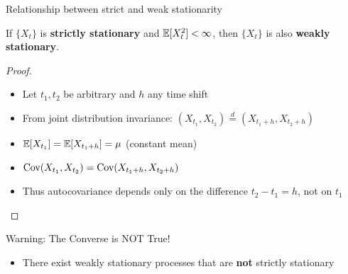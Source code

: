 \documentclass[9pt, aspectratio=169, t]{beamer}
\begin{document}
\begin{frame}{Relationship between strict and weak stationarity}
    \begin{thm}
        If $\{X_t\}$ is \textbf{strictly stationary} and $\mathbb{E}[X_t^2] < \infty$, then $\{X_t\}$ is also \textbf{weakly stationary}.
    \end{thm}

    \begin{proof}[Proof]
        \begin{itemize}\setlength{\itemsep}{0pt}
            \item Let $t_1, t_2$ be arbitrary and $h$ any time shift
            \item From joint distribution invariance: $(X_{t_1}, X_{t_2}) \stackrel{d}{=} (X_{t_1+h}, X_{t_2+h})$
            \item $\mathbb{E}[X_{t_1}] = \mathbb{E}[X_{t_1+h}] = \mu$ (constant mean)
            \item $\text{Cov}(X_{t_1}, X_{t_2}) = \text{Cov}(X_{t_1+h}, X_{t_2+h})$
            \item Thus autocovariance depends only on the difference $t_2 - t_1 = h$, not on $t_1$
        \end{itemize}
    \end{proof}

    \begin{alertblock}{Warning: The Converse is NOT True!}
        \begin{itemize}\setlength{\itemsep}{0pt}
            \item There exist weakly stationary processes that are \textbf{not} strictly stationary
        \end{itemize}
    \end{alertblock}
\end{frame}
\end{document}
